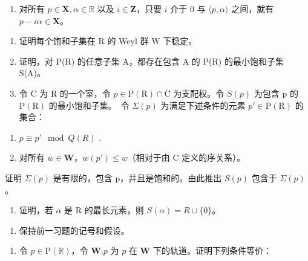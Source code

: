 \begin{enumerate}
\def\labelenumi{(\Alph{enumi})}
\setcounter{enumi}{18}
\tightlist
\item
  对所有 \(p \in \mathbf{X}, \alpha \in \mathbb{R}\) 以及 \(i \in \mathbf{Z}\)，只要 \(i\) 介于 0 与 \(\langle p, \alpha \rangle\) 之间，就有 \(p - i\alpha \in \mathbf{X}\)。
\end{enumerate}

\begin{enumerate}
\def\labelenumi{\alph{enumi})}
\item
  证明每个饱和子集在 R 的 Weyl 群 W 下稳定。
\item
  证明，对 P(R) 的任意子集 A，都存在包含 A 的 P(R) 的最小饱和子集 S(A)。
\item
  令 C 为 R 的一个室，令 \(p \in \mathrm{P}(\mathrm{R}) \cap \overline{\mathrm{C}}\) 为支配权。令 \(S(p)\) 为包含 p 的 \(\mathrm{P}(\mathrm{R})\) 的最小饱和子集。~令 \(\Sigma(p)\) 为满足下述条件的元素 \(p' \in \mathrm{P}(\mathrm{R})\) 的集合：
\end{enumerate}

\begin{enumerate}
\def\labelenumi{(\roman{enumi})}
\item
  \(p \equiv p' \mod Q(R)\) .
\item
  对所有 \(w \in \mathbf{W}\)，\(w(p') \leqslant w\)（相对于由 C 定义的序关系）。
\end{enumerate}

证明 \(\Sigma(p)\) 是有限的，包含 p，并且是饱和的。由此推出 \(S(p)\) 包含于 \(\Sigma(p)\)。

\begin{enumerate}
\def\labelenumi{\alph{enumi})}
\setcounter{enumi}{3}
\tightlist
\item
  证明，若 \(\alpha\) 是 R 的最长元素，则 \(S(\alpha) = R \cup \{0\}\)。
\end{enumerate}

\begin{enumerate}
\def\labelenumi{\arabic{enumi})}
\setcounter{enumi}{23}
\tightlist
\item
  保持前一习题的记号和假设。
\end{enumerate}

\begin{enumerate}
\def\labelenumi{\alph{enumi})}
\tightlist
\item
  令 \(p \in \mathrm{P}(\mathbb{R})\)，令 \(\mathbf{W}.p\) 为 \(p\) 在 \(\mathbf{W}\) 下的轨道。证明下列条件等价：
\end{enumerate}

